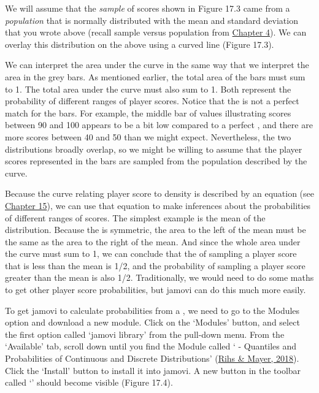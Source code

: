 \documentclass[
  openany]{krantz}
\begin{document}
We will assume that the \emph{sample} of scores shown in Figure 17.3 came from a \emph{population} that is normally distributed with the mean and standard deviation that you wrote above (recall sample versus population from \protect\hyperlink{Chapter_4}{Chapter 4}).
We can overlay this distribution on the  above using a curved line (Figure 17.3).

We can interpret the area under the curve in the same way that we interpret the area in the grey bars.
As mentioned earlier, the total area of the  bars must sum to 1.
The total area under the curve must also sum to 1.
Both represent the probability of different ranges of player scores.
Notice that the  is not a perfect match for the  bars.
For example, the middle bar of values illustrating scores between 90 and 100 appears to be a bit low compared to a perfect , and there are more scores between 40 and 50 than we might expect.
Nevertheless, the two distributions broadly overlap, so we might be willing to assume that the player scores represented in the  bars are sampled from the population described by the curve.

Because the curve relating player score to  density is described by an equation (see \protect\hyperlink{Chapter_15}{Chapter 15}), we can use that equation to make inferences about the probabilities of different ranges of scores.
The simplest example is the mean of the distribution.
Because the  is symmetric, the area to the left of the mean must be the same as the area to the right of the mean.
And since the whole area under the curve must sum to 1, we can conclude that the  of sampling a player score that is less than the mean is 1/2, and the probability of sampling a player score greater than the mean is also 1/2.
Traditionally, we would need to do some maths to get other player score probabilities, but jamovi can do this much more easily.

To get jamovi to calculate probabilities from a , we need to go to the Modules option and download a new module.
Click on the `Modules' button, and select the first option called `jamovi library' from the pull-down menu.
From the `Available' tab, scroll down until you find the Module called ` - Quantiles and Probabilities of Continuous and Discrete Distributions' (\protect\hyperlink{ref-Rihs2018}{Rihs \& Mayer, 2018}).
Click the `Install' button to install it into jamovi.
A new button in the toolbar called `' should become visible (Figure 17.4).
\end{document}
